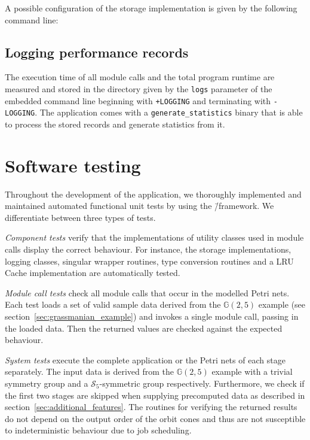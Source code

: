 A possible configuration of the storage implementation is given by the following command line:


\subsection*{Logging performance records}

The execution time of all module calls and the total program runtime are measured and stored in the directory given by the \texttt{logs} parameter of the embedded command line beginning with \texttt{+LOGGING} and terminating with \texttt{-LOGGING}. The application comes with a \texttt{generate\_statistics} binary that is able to process the stored records and generate statistics from it.

\section{Software testing}

Throughout the development of the application, we thoroughly implemented and maintained automated functional unit tests by using the \gtest{}\=/framework. We differentiate between three types of tests.

\emph{Component tests} verify that the implementations of utility classes used in module calls display the correct behaviour. For instance, the storage implementations, logging classes, singular wrapper routines, type conversion routines and a LRU Cache implementation are automatically tested.

\emph{Module call tests} check all module calls that occur in the modelled Petri nets. 
Each test loads a set of valid sample data derived from the $\mathbb{G}(2,5)$ example (see section~\ref{sec:grassmanian_example}) and invokes a single module call, passing in the loaded data. Then the returned values are checked against the expected behaviour.

\emph{System tests} execute the complete application or the Petri nets of each stage separately. The input data is derived from the $\mathbb{G}(2,5)$ example with a trivial symmetry group and a $\mathcal{S}_5$-symmetric group respectively. Furthermore, we check if the first two stages are skipped when supplying precomputed data as described in section~\ref{sec:additional_features}. The routines for verifying the returned results do not depend on the output order of the orbit cones and thus are not susceptible to indeterministic behaviour due to job scheduling.


